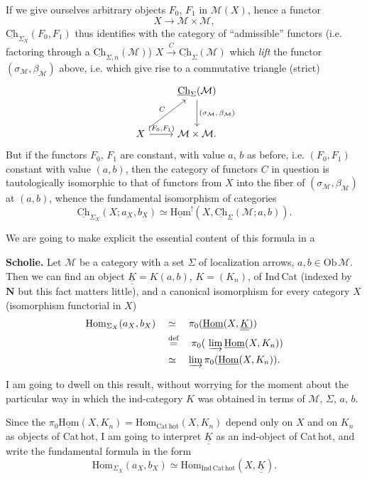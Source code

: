 \documentclass[11pt]{article}
\newcommand{\printedpage}[1]{\marginpar{\footnotesize p.~#1}}
\newcommand{\msp}[1]{\marginpar{\footnotesize [#1]}}
\newcommand{\cM}{\mathcal{M}}
\newcommand{\Ch}{\underline{\mathrm{Ch}}}
\newcommand{\KK}{\underline{\underline{K}}}
\newcommand{\dfeq}{\overset{\text{def}}{=}}
\newcommand{\Cathot}{\mathrm{Cat\,hot}}
\newcommand{\uHom}{\underline{\mathrm{Hom}}}
\begin{document}
If we give ourselves arbitrary objects $F_0$, $F_1$ in $\cM(X)$, hence a functor
\[
X\longrightarrow\cM\times\cM,
\]
$\Ch_{\Sigma_X}(F_0,F_1)$ thus identifies with the category of ``admissible'' functors (i.e. factoring through a $\Ch_{\Sigma,n}(\cM)$) $X\xrightarrow{\ C\ }\Ch_{\Sigma}(\cM)$ which \textit{lift}
\msp{page 32: blank}
\msp{page 33}
the functor $(\sigma_{\cM},\beta_{\cM})$ above, i.e. which give rise to a commutative triangle (strict)
\[
\begin{tikzcd}[row sep=large]
 & \Ch_{\Sigma}(\cM) \arrow[d, "{(\sigma_{\cM},\,\beta_{\cM})}"] \\
X \arrow[ur, "C"] \arrow[r, "{(F_0,F_1)}"] & \cM\times\cM.
\end{tikzcd}
\]
But if the functors $F_0$, $F_1$ are constant, with value $a$, $b$ as before, i.e. $(F_0,F_1)$ constant with value $(a,b)$, then the category of functors $C$ in question is tautologically isomorphic to that of functors from $X$ into the fiber of $(\sigma_{\cM},\beta_{\cM})$ at $(a,b)$, whence the fundamental isomorphism of categories
\[
\boxed{\Ch_{\Sigma_X}(X;a_X,b_X)\simeq\uHom^{!}(X,\Ch_{\Sigma}(\cM;a,b)).}
\]

We are going to make explicit the essential content of this formula in a

\textbf{Scholie.} Let $\cM$ be a category with a set $\Sigma$ of localization arrows, $a,b\in\mathrm{Ob}\,\cM$. Then we can find an object $\KK=K(a,b)$, $K=(K_n)$, of Ind\,Cat (indexed by $\mathbf{N}$ but this fact matters little), and a canonical isomorphism for every category $X$ (isomorphism functorial in $X$)
\[
\begin{aligned}
\mathrm{Hom}_{\Sigma_X}(a_X,b_X) \quad &\simeq \quad \pi_0(\uHom(X,\KK)) \\
&\dfeq \quad \pi_0(\ \varinjlim \uHom(X,K_n)) \\
&\simeq \quad \varinjlim \pi_0(\uHom(X,K_n)).
\end{aligned}
\]

\printedpage{21}

\msp{page 34}
I am going to dwell on this result, without worrying for the moment about the particular way in which the ind-category $K$ was obtained in terms of $\cM$, $\Sigma$, $a$, $b$.

Since the $\pi_0\uHom(X,K_n)=\mathrm{Hom}_{\Cathot}(X,K_n)$ depend only on $X$ and on $K_n$ as objects of Cat\,hot, I am going to interpret $\KK$ as an ind-object of Cat\,hot, and write the fundamental formula in the form
\[
\mathrm{Hom}_{\Sigma_X}(a_X,b_X)\simeq\mathrm{Hom}_{\mathrm{Ind\,Cat\,hot}}(X,\KK).
\]
\end{document}
